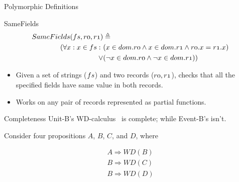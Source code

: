 \documentclass[10pt]{beamer}
\newcommand{\unitb}{Unit-B\xspace}
\newcommand{\eventb}{Event-B\xspace}
\begin{document}
\begin{frame}[fragile]{Polymorphic Definitions}
  \begin{block}{SameFields}
  \begin{align*}
    \mathnormal{SameFields(fs, r0, r1)} & \triangleq \\
    \mathnormal{(\forall x: x \in fs:\ }
    & \mathnormal{(x \in dom.r0 \wedge x \in dom.r1 \wedge r0.x =
      r1.x)}\\
    \mathnormal{\vee} & \mathnormal{(\neg x \in dom.r0 \wedge \neg x
      \in dom.r1))}
  \end{align*}
  \end{block}
  \pause

  \begin{itemize}[<+->]
  \item Given a set of strings ($\mathnormal{fs}$) and two records
    ($\mathnormal{r0, r1}$), checks that all the specified fields have
    same value in both records.
  \item Works on any pair of records represented as partial functions.
  \end{itemize}
\end{frame}

\begin{frame}{Completeness}
  \unitb's WD-calculus~\cite{DBLP:conf/cade/DarvasMR08} is complete;
  while \eventb's isn't.
  \pause

  \vspace{0.5cm}
  Consider four propositions $A$, $B$, $C$, and $D$, where

  \vspace{-3ex}
  \begin{eqnarray*}
    A \Rightarrow WD(B) \\
    B \Rightarrow WD(C) \\
    B \Rightarrow WD(D)
  \end{eqnarray*}
\end{frame}
\end{document}
